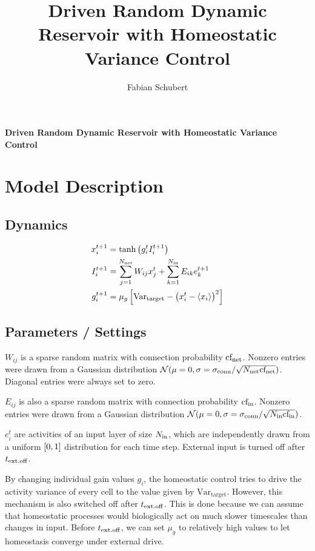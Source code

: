 \documentclass[10pt,a4paper]{article}
\author{Fabian Schubert}
\title{Driven Random Dynamic Reservoir with Homeostatic Variance Control}
\begin{document}
\begin{center}
\begin{LARGE}
\textbf{Driven Random Dynamic Reservoir with Homeostatic Variance Control}\\
\end{LARGE}
\end{center}

\section{Model Description}

\subsection{Dynamics}
\begin{align}
x_i^{t+1} &= \mathrm{tanh}\left( g_i^t I_i^{t+1} \right) \\
I_i^{t+1} &= \sum_{j=1}^{N_{\rm net}} W_{ij} x_j^t + \sum_{k=1}^{N_{\rm in}} E_{ik} e_k^{t+1} \\
g_i^{t+1} &= \mu_{g} \left[ \mathrm{Var_{target}} - \left( x_i^t - \langle x_i \rangle \right)^2 \right]
\end{align}

\subsection{Parameters / Settings}

$W_{ij}$ is a sparse random matrix with connection probability ${\rm cf_{net}}$. Nonzero entries were drawn from a Gaussian distribution $\mathcal{N}(\mu = 0,\sigma = \sigma_{\rm conn} / \sqrt{N_{\rm net} {\rm cf_{net}}})$. Diagonal entries were always set to zero.

$E_{ij}$ is also a sparse random matrix with connection probability ${\rm cf_{in}}$. Nonzero entries were drawn from a Gaussian distribution $\mathcal{N}(\mu = 0,\sigma = \sigma_{\rm conn} / \sqrt{N_{\rm in} {\rm cf_{in}}})$.

$e_i^{t}$ are activities of an input layer of size $N_{\rm in}$, which are independently drawn from a uniform $\rm \left[0,1\right]$ distribution for each time step. External input is turned off after $t_{\rm ext.off}$.

By changing individual gain values $g_i$, the homeostatic control tries to drive the activity variance of every cell to the value given by $\mathrm{Var_{target}}$. However, this mechanism is also switched off after $t_{\rm ext.off}$. This is done because we can assume that homeostatic processes would biologically act on much slower timescales than changes in input. Before $t_{\rm ext.off}$, we can set $\mu_{g}$ to relatively high values to let homeostasis converge under external drive.
\end{document}
